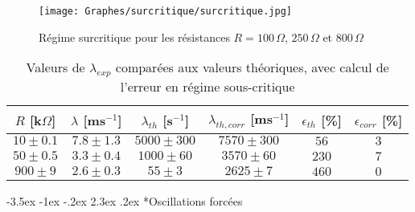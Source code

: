 \documentclass[a4paper, 12pt,oneside]{article}
\makeatletter
\renewcommand{\subsection}{\@startsection {subsection}{1}{\z@}%
             {-3.5ex \@plus -1ex \@minus -.2ex}%
             {2.3ex \@plus.2ex}%
             {\normalfont\normalsize\bfseries}}
\makeatother
\begin{document}
\vspace{-0.2cm}
\begin{wrapfigure}{h}{0.5\textwidth}
\vspace{-1.7cm}
\raggedleft  %
\texttt{[image: Graphes/surcritique/surcritique.jpg]}
\captionsetup{justification=raggedright}
\vspace{-0.7cm}
\captionsetup{justification=centering}
\caption{Régime surcritique pour les résistances $R = 100\,\Omega,\,250\,\Omega$ et $800\,\Omega$}
\label{fig4}
\vspace{-1cm}
\end{wrapfigure}
\vspace{-0.2cm}
\begin{table}[b]
\centering
 \begin{tabular}{||c| c| c| c| c| c||} 
 \hline
 $R$ [k$\Omega$] & $\lambda$ [ms$^{-1}$] & $\lambda_{th}$ [s$^{-1}$] & $\lambda_{th,corr}$ [ms$^{-1}$] & $\epsilon_{th}$ [\%] & $\epsilon_{corr}$ [\%]\\ [0.5ex] 
 \hline\hline
 $10 \pm 0.1$ & $7.8 \pm 1.3$ & $5000 \pm 300$ & $7570 \pm 300$ & $56$ & $3$\\
 \hline
 $50 \pm 0.5$ & $3.3 \pm 0.4$ & $1000\pm 60$ & $3570\pm 60$ & $230$ & $7$ \\
 \hline
 $900 \pm 9$ & $2.6 \pm 0.3$ & $55 \pm 3 $ & $2625 \pm 7$ & $460$ & $0$\\
\hline
\end{tabular}
\captionsetup{justification=centering}
\caption{Valeurs de $\lambda_{exp}$ comparées aux valeurs théoriques, avec calcul de l'erreur en régime sous-critique}
\label{table1}
\vspace{-0.5cm}
\end{table}
\clearpage

\subsection*{Oscillations forcées}
\end{document}

